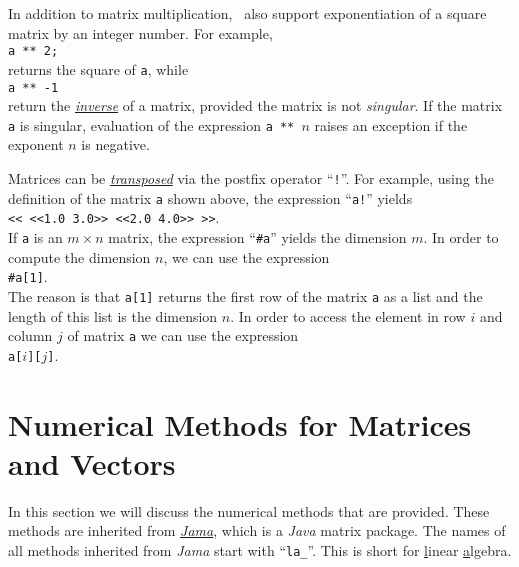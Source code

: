 In addition to matrix multiplication, \setlx\ also support exponentiation of a square matrix by an
integer number.  For example, 
\\[0.2cm]
\hspace*{1.3cm}
\texttt{a ** 2;}
\\[0.2cm]
returns the square  of \texttt{a}, while 
\\[0.2cm]
\hspace*{1.3cm}
\texttt{a ** -1}
\\[0.2cm]
return the \href{http://en.wikipedia.org/wiki/Invertible_matrix}{\emph{inverse}} of a matrix,
provided the matrix is not \emph{singular}.  If the matrix \texttt{a} is singular, evaluation of the
expression \texttt{a ** $n$} raises an exception if the exponent $n$ is negative.

Matrices can be \href{http://en.wikipedia.org/wiki/Transpose}{\emph{transposed}} via the postfix
operator ``\texttt{!}''.  For example, using the definition of the matrix \texttt{a} shown above,
the expression ``\texttt{a!}'' yields 
\\[0.2cm]
\hspace*{1.3cm}
\texttt{<< <<1.0 3.0>> <<2.0 4.0>> >>}.
\\[0.2cm]
If \texttt{a} is an $m \times n$ matrix, the expression ``\texttt{\#a}'' yields the dimension $m$.  
In order to compute the dimension $n$, we can use the expression 
\\[0.2cm]
\hspace*{1.3cm}
\texttt{\#a[1]}.
\\[0.2cm]
The reason is that \texttt{a[1]} returns the first row of the matrix \texttt{a} as a list and the
length of this list is the dimension $n$.  In order to access the element in row $i$ and column $j$
of matrix \texttt{a} we can use the expression
\\[0.2cm]
\hspace*{1.3cm}
\texttt{a[$i$][$j$]}.

\section{Numerical Methods for Matrices and Vectors}
In this section we will discuss the numerical methods that are provided.  These methods are inherited
from \href{http://math.nist.gov/javanumerics/jama/}{\textsl{Jama}}, which is a \textsl{Java} matrix
package.  The names of all methods inherited from \textsl{Jama} start with ``\texttt{la\_}''.  This
is short for \underline{l}inear \underline{a}lgebra.

